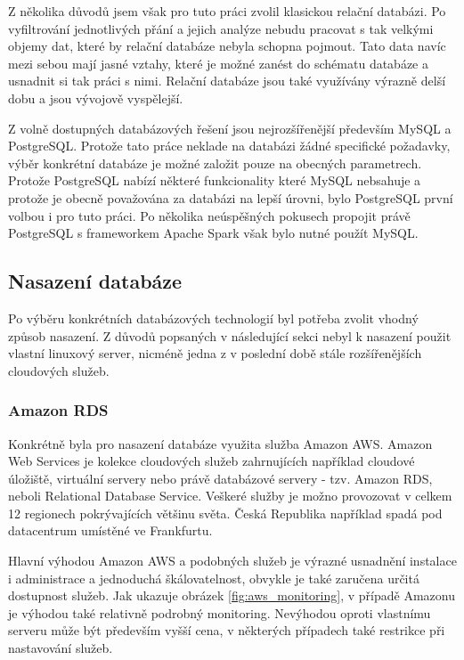 \documentclass[thesis=B,czech]{FITthesis}[2012/06/26]
\begin{document}
	Z několika důvodů jsem však pro tuto práci zvolil klasickou relační databázi. Po vyfiltrování jednotlivých přání a jejich analýze nebudu pracovat s tak velkými objemy dat, které by relační databáze nebyla schopna pojmout. Tato data navíc mezi sebou mají jasné vztahy, které je možné zanést do schématu databáze a usnadnit si tak práci s nimi. Relační databáze jsou také využívány výrazně delší dobu a jsou vývojově vyspělejší. 
	
	Z volně dostupných databázových řešení jsou nejrozšířenější především MySQL a PostgreSQL. Protože tato práce neklade na databázi žádné specifické požadavky, výběr konkrétní databáze je možné založit pouze na obecných parametrech. Protože PostgreSQL nabízí některé funkcionality které MySQL nebsahuje a protože je obecně považována za databázi na lepší úrovni\cite{aaaaaaaa}, bylo PostgreSQL první volbou i pro tuto práci. Po několika neúspěšných pokusech propojit právě PostgreSQL s frameworkem Apache Spark však bylo nutné použít MySQL. 
	
\subsection{Nasazení databáze}
	Po výběru konkrétních databázových technologií byl potřeba zvolit vhodný způsob nasazení. Z důvodů popsaných v následující sekci nebyl k nasazení použit vlastní linuxový server, nicméně jedna z v poslední době stále rozšířenějších cloudových služeb. 
	
\subsubsection{Amazon RDS}
	Konkrétně byla pro nasazení databáze využita služba Amazon AWS\cite{gghjjkk}. Amazon Web Services je kolekce cloudových služeb zahrnujících například cloudové úložiště, virtuální servery nebo právě databázové servery - tzv. Amazon RDS, neboli Relational Database Service. Veškeré služby je možno provozovat v celkem 12 regionech pokrývajících většinu světa. Česká Republika například spadá pod datacentrum umístěné ve Frankfurtu. 
	
	Hlavní výhodou Amazon AWS a podobných služeb je výrazné usnadnění instalace i administrace a jednoduchá škálovatelnost, obvykle je také zaručena určitá dostupnost služeb. Jak ukazuje obrázek \ref{fig:aws_monitoring}, v případě Amazonu je výhodou také relativně podrobný monitoring. Nevýhodou oproti vlastnímu serveru může být především vyšší cena, v některých případech také restrikce při nastavování služeb. 
	
\end{document}
